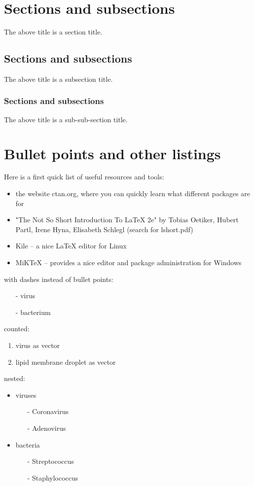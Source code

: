 \documentclass[11pt,a4paper,twoside,titlepage]{book}
\begin{document}
\section{Sections and subsections}

The above title is a section title.

\subsection{Sections and subsections}

The above title is a subsection title.

\subsubsection{Sections and subsections}

The above title is a sub-sub-section title.

\section{Bullet points and other listings}

Here is a first quick list of useful resources and tools:
\begin{itemize}
\item the website ctan.org, where you can quickly learn what different packages are for
\item "The Not So Short Introduction To LaTeX 2e" by Tobias Oetiker, Hubert Partl, Irene Hyna, Elisabeth Schlegl (search for lshort.pdf)
\item Kile -- a nice LaTeX editor for Linux
\item MiKTeX -- provides a nice editor and package administration for Windows
\end{itemize}


with dashes instead of bullet points:
\begin{itemize}
\item[-] virus
\item[-] bacterium
\end{itemize}

counted:
\begin{enumerate}
\item virus as vector
\item lipid membrane droplet as vector
\end{enumerate}

nested:
\begin{itemize}
\item viruses
\begin{itemize}
\item[-] Coronavirus
\item[-] Adenovirus
\end{itemize}
\item bacteria
\begin{itemize}
\item[-] Streptococcus
\item[-] Staphylococcus
\end{itemize}
\end{itemize}
\end{document}

